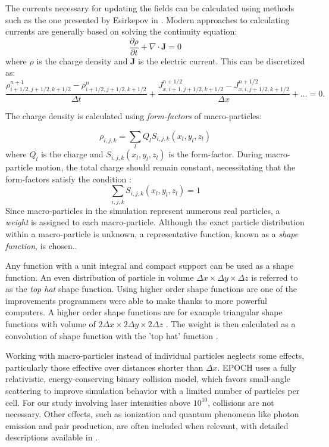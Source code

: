 The currents necessary for updating the fields can be calculated using methods such as the one presented by Esirkepov in \cite{esirkepov2001}. Modern approaches to calculating currents are generally based on solving the continuity equation:
\begin{equation}
	\frac{\partial\rho}{\partial t} + \nabla \cdot \bm{J} = 0
	\label{eq:conti}
\end{equation} 
where $\rho$ is the charge density and $\bm{J}$ is the electric current. This can be discretized as:
\begin{equation}
	\frac{\rho^{n+1}_{i+1/2,j+1/2,k+1/2}-\rho^{n}_{i+1/2,j+1/2,k+1/2}}{\Delta t} + \frac{J^{n+1/2}_{x,i+1,j+1/2,k+1/2}-J^{n+1/2}_{x,i,j+1/2,k+1/2}}{\Delta x} + \dots = 0.
\end{equation}

The charge density is calculated using \textit{form-factors} of macro-particles:

\begin{equation}
	\rho_{i,j,k} = \sum_{l}Q_l S_{i,j,k}(x_l,y_l,z_l)
\end{equation}
where $Q_l$ is the charge and $S_{i,j,k}(x_l,y_l,z_l)$ is the form-factor. During macro-particle motion, the total charge should remain constant, necessitating that the form-factors satisfy the condition :
\begin{equation}
	\sum_{i,j,k}S_{i,j,k}(x_l,y_l,z_l) = 1
\end{equation}
Since macro-particles in the simulation represent numerous real particles, a \textit{weight} is assigned to each macro-particle. Although the exact particle distribution within a macro-particle is unknown, a representative function, known as a \textit{shape function}, is chosen.\cite{arber2015}. 

Any function with a unit integral and compact support can be used as a shape function. An even distribution of particle in volume $\Delta x \times \Delta y \times \Delta z$ is referred to as the \textit{top hat} shape function. Using higher order shape functions are one of the improvements programmers were able to make thanks to more powerful computers. A higher order shape functions are for example triangular shape functions with volume of $2\Delta x \times 2\Delta y \times 2\Delta z$  . The weight is then calculated as a convolution of shape function with the 'top hat' function \cite{arber2015}.

Working with macro-particles instead of individual particles neglects some effects, particularly those effective over distances shorter than $\Delta x$. EPOCH uses a fully relativistic, energy-conserving binary collision model, which favors small-angle scattering to improve simulation behavior with a limited number of particles per cell. For our study involving laser intensities above $10^{10}$, collisions are not necessary. Other effects, such as ionization and quantum phenomena like photon emission and pair production, are often included when relevant, with detailed descriptions available in \cite{arber2015}.